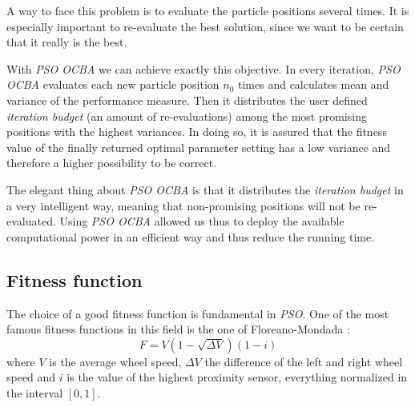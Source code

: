 \documentclass[journal]{IEEEtran}
\begin{document}
A way to face this problem is to evaluate the particle positions several times. It is especially important to re-evaluate the best solution, since we want to be certain that it really is the best.

With \textit{PSO OCBA} we can achieve exactly this objective. In every iteration, \textit{PSO OCBA} evaluates each new particle position $n_0$ times and calculates mean and variance of the performance measure. Then it distributes the user defined \textit{iteration budget} (an amount of re-evaluations) among the most promising positions with the highest variances. In doing so, it is assured that the fitness value of the finally returned optimal parameter setting has a low variance and therefore a higher possibility to be correct. 

The elegant thing about \textit{PSO OCBA} is that it distributes the \textit{iteration budget} in a very intelligent way, meaning that non-promising positions will not be re-evaluated. Using \textit{PSO OCBA} allowed us thus to deploy the available computational power in an efficient way and thus reduce the running time.

\subsection{Fitness function}
The choice of a good fitness function is fundamental in \textit{PSO}. One of the most famous fitness functions in this field is the one of Floreano-Mondada \cite{IEEEhowto:fitness_floreano_mondada}:
\begin {equation}
F=V(1-\sqrt{\Delta V})(1-i)
\end{equation}
where $V$ is the average wheel speed, $\Delta V$ the difference of the left and right wheel speed and $i$ is the value of the highest proximity sensor, everything normalized in the interval $[0,1]$. 
\end{document}
